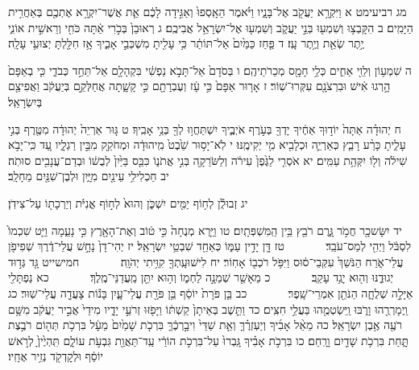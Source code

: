 \documentclass[twoside, openany, parskip=half, 11pt]{book}
\begin{document}
מג רביעימט א וַיִּקְרָ֥א יַעֲקֹ֖ב אֶל־בָּנָ֑יו וַיֹּ֗אמֶר הֵאָֽסְפוּ֙ וְאַגִּ֣ידָה לָכֶ֔ם אֵ֛ת אֲשֶׁר־יִקְרָ֥א אֶתְכֶ֖ם בְּאַחֲרִ֥ית הַיָּמִֽים׃ ב הִקָּבְצ֥וּ וְשִׁמְע֖וּ בְּנֵ֣י יַעֲקֹ֑ב וְשִׁמְע֖וּ אֶל־יִשְׂרָאֵ֥ל אֲבִיכֶֽם׃ ג רְאוּבֵן֙ בְּכֹ֣רִי אַ֔תָּה כֹּחִ֖י וְרֵאשִׁ֣ית אוֹנִ֑י יֶ֥תֶר שְׂאֵ֖ת וְיֶ֥תֶר עָֽז׃ ד פַּ֤חַז כַּמַּ֙יִם֙ אַל־תּוֹתַ֔ר כִּ֥י עָלִ֖יתָ מִשְׁכְּבֵ֣י אָבִ֑יךָ אָ֥ז חִלַּ֖לְתָּ יְצוּעִ֥י עָלָֽה׃

ה שִׁמְע֥וֹן וְלֵוִ֖י אַחִ֑ים כְּלֵ֥י חָמָ֖ס מְכֵרֹתֵיהֶֽם׃ ו בְּסֹדָם֙ אַל־תָּבֹ֣א נַפְשִׁ֔י בִּקְהָלָ֖ם אַל־תֵּחַ֣ד כְּבֹדִ֑י כִּ֤י בְאַפָּם֙ הָ֣רְגוּ אִ֔ישׁ וּבִרְצֹנָ֖ם עִקְּרוּ־שֽׁוֹר׃ ז אָר֤וּר אַפָּם֙ כִּ֣י עָ֔ז וְעֶבְרָתָ֖ם כִּ֣י קָשָׁ֑תָה אֲחַלְּקֵ֣ם בְּיַעֲקֹ֔ב וַאֲפִיצֵ֖ם בְּיִשְׂרָאֵֽל׃

ח יְהוּדָ֗ה אַתָּה֙ יוֹד֣וּךָ אַחֶ֔יךָ יָדְךָ֖ בְּעֹ֣רֶף אֹיְבֶ֑יךָ יִשְׁתַּחֲו֥וּ לְךָ֖ בְּנֵ֥י אָבִֽיךָ׃ ט גּ֤וּר אַרְיֵה֙ יְהוּדָ֔ה מִטֶּ֖רֶף בְּנִ֣י עָלִ֑יתָ כָּרַ֨ע רָבַ֧ץ כְּאַרְיֵ֛ה וּכְלָבִ֖יא מִ֥י יְקִימֶֽנּוּ׃ י לֹֽא־יָס֥וּר שֵׁ֙בֶט֙ מִֽיהוּדָ֔ה וּמְחֹקֵ֖ק מִבֵּ֣ין רַגְלָ֑יו עַ֚ד כִּֽי־יָבֹ֣א שִׁילֹ֔ה וְל֖וֹ יִקְּהַ֥ת עַמִּֽים׃ יא אֹסְרִ֤י לַגֶּ֙פֶן֙ עִירֹ֔ה וְלַשֹּׂרֵקָ֖ה בְּנִ֣י אֲתֹנ֑וֹ כִּבֵּ֤ס בַּיַּ֙יִן֙ לְבֻשׁ֔וֹ וּבְדַם־עֲנָבִ֖ים סוּתֹֽה׃ יב חַכְלִילִ֥י עֵינַ֖יִם מִיָּ֑יִן וּלְבֶן־שִׁנַּ֖יִם מֵחָלָֽב׃

יג זְבוּלֻ֕ן לְח֥וֹף יַמִּ֖ים יִשְׁכֹּ֑ן וְהוּא֙ לְח֣וֹף אֳנִיֹּ֔ת וְיַרְכָת֖וֹ עַל־צִידֹֽן׃

יד יִשָּׂשכָ֖ר חֲמֹ֣ר גָּ֑רֶם רֹבֵ֖ץ בֵּ֥ין הַֽמִּשְׁפְּתָֽיִם׃ טו וַיַּ֤רְא מְנֻחָה֙ כִּ֣י ט֔וֹב וְאֶת־הָאָ֖רֶץ כִּ֣י נָעֵ֑מָה וַיֵּ֤ט שִׁכְמוֹ֙ לִסְבֹּ֔ל וַיְהִ֖י לְמַס־עֹבֵֽד׃
　　　 טז דָּ֖ן יָדִ֣ין עַמּ֑וֹ כְּאַחַ֖ד שִׁבְטֵ֥י יִשְׂרָאֵֽל׃ יז יְהִי־דָן֙ נָחָ֣שׁ עֲלֵי־דֶ֔רֶךְ שְׁפִיפֹ֖ן עֲלֵי־אֹ֑רַח הַנֹּשֵׁךְ֙ עִקְּבֵי־ס֔וּס וַיִּפֹּ֥ל רֹכְב֖וֹ אָחֽוֹר׃ יח לִישׁוּעָֽתְךָ֖ קִוִּ֥יתִי יְהֹוָֽה׃
　　　 חמישייט גָּ֖ד גְּד֣וּד יְגוּדֶ֑נּוּ וְה֖וּא יָגֻ֥ד עָקֵֽב׃
　　　 כ מֵאָשֵׁ֖ר שְׁמֵנָ֣ה לַחְמ֑וֹ וְה֥וּא יִתֵּ֖ן מַֽעֲדַנֵּי־מֶֽלֶךְ׃
　　　 כא נַפְתָּלִ֖י אַיָּלָ֣ה שְׁלֻחָ֑ה הַנֹּתֵ֖ן אִמְרֵי־שָֽׁפֶר׃
　　　 כב בֵּ֤ן פֹּרָת֙ יוֹסֵ֔ף בֵּ֥ן פֹּרָ֖ת עֲלֵי־עָ֑יִן בָּנ֕וֹת צָעֲדָ֖ה עֲלֵי־שֽׁוּר׃ כג וַֽיְמָרְרֻ֖הוּ וָרֹ֑בּוּ וַֽיִּשְׂטְמֻ֖הוּ בַּעֲלֵ֥י חִצִּֽים׃ כד וַתֵּ֤שֶׁב בְּאֵיתָן֙ קַשְׁתּ֔וֹ וַיָּפֹ֖זּוּ זְרֹעֵ֣י יָדָ֑יו מִידֵי֙ אֲבִ֣יר יַעֲקֹ֔ב מִשָּׁ֥ם רֹעֶ֖ה אֶ֥בֶן יִשְׂרָאֵֽל׃ כה מֵאֵ֨ל אָבִ֜יךָ וְיַעְזְרֶ֗ךָּ וְאֵ֤ת שַׁדַּי֙ וִיבָ֣רְכֶ֔ךָּ בִּרְכֹ֤ת שָׁמַ֙יִם֙ מֵעָ֔ל בִּרְכֹ֥ת תְּה֖וֹם רֹבֶ֣צֶת תָּ֑חַת בִּרְכֹ֥ת שָׁדַ֖יִם וָרָֽחַם׃ כו בִּרְכֹ֣ת אָבִ֗יךָ גָּֽבְרוּ֙ עַל־בִּרְכֹ֣ת הוֹרַ֔י עַֽד־תַּאֲוַ֖ת גִּבְעֹ֣ת עוֹלָ֑ם תִּֽהְיֶ֙יןָ֙ לְרֹ֣אשׁ יוֹסֵ֔ף וּלְקׇדְקֹ֖ד נְזִ֥יר אֶחָֽיו׃
\end{document}

